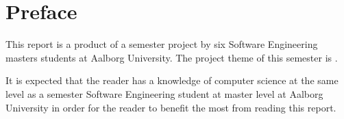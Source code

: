 \chapter*{Preface}
This report is a product of a  semester project by six Software Engineering masters students at Aalborg University. The project theme of this semester is \projecttheme.

It is expected that the reader has a knowledge of computer science at the same level as a  semester Software Engineering student at master level at Aalborg University in order for the reader to benefit the most from reading this report.